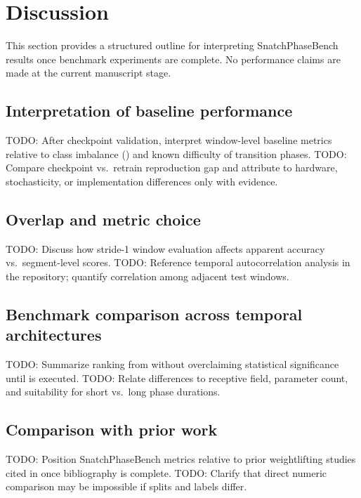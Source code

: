 \section{Discussion}
\label{sec:discussion}

This section provides a structured outline for interpreting SnatchPhaseBench results once benchmark experiments are complete.
No performance claims are made at the current manuscript stage.

\subsection{Interpretation of baseline performance}
\label{sec:discussion:interpretation}

\textsc{TODO:} After checkpoint validation, interpret window-level baseline metrics relative to class imbalance () and known difficulty of transition phases.
\textsc{TODO:} Compare checkpoint vs.\ retrain reproduction gap and attribute to hardware, stochasticity, or implementation differences only with evidence.

\subsection{Overlap and metric choice}
\label{sec:discussion:overlap}

\textsc{TODO:} Discuss how stride-1 window evaluation affects apparent accuracy vs.\ segment-level scores.
\textsc{TODO:} Reference temporal autocorrelation analysis in the repository; quantify correlation among adjacent test windows.

\subsection{Benchmark comparison across temporal architectures}
\label{sec:discussion:benchmark}

\textsc{TODO:} Summarize ranking from  without overclaiming statistical significance until  is executed.
\textsc{TODO:} Relate differences to receptive field, parameter count, and suitability for short vs.\ long phase durations.

\subsection{Comparison with prior work}
\label{sec:discussion:prior}

\textsc{TODO:} Position SnatchPhaseBench metrics relative to prior weightlifting studies cited in  once bibliography is complete.
\textsc{TODO:} Clarify that direct numeric comparison may be impossible if splits and labels differ.

